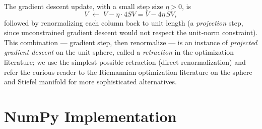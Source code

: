 \begin{keyidea}
The gradient descent update, with a small step size $\eta>0$, is
\[
  V \;\longleftarrow\; V - \eta\cdot4SV = V - 4\eta\,SV,
\]
followed by renormalizing each column back to unit length (a
\emph{projection} step, since unconstrained gradient descent would not
respect the unit-norm constraint). This combination --- gradient step,
then renormalize --- is an instance of \emph{projected gradient descent}
on the unit sphere, called a \emph{retraction} in the optimization
literature; we use the simplest possible retraction (direct
renormalization) and refer the curious reader to the Riemannian
optimization literature on the sphere and Stiefel manifold for more
sophisticated alternatives.
\end{keyidea}

\section{NumPy Implementation}
\label{sec:numpy-fp}

